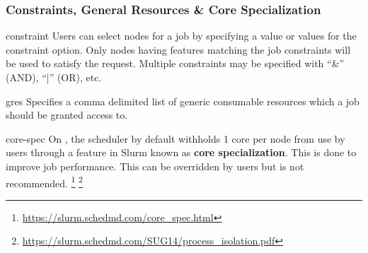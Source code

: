 \begin{frame}
\frametitle{Constraints, General Resources \& Core Specialization}
\vspace{-8pt}
\begin{block}{{\ddash}constraint} Users can select nodes for a job by specifying a value or values for the constraint option. Only nodes having features matching the job constraints will be used to satisfy the request. Multiple constraints may be specified with ``\&'' (AND), ``|'' (OR), etc.
\end{block}
\vspace{-5pt}
\begin{block}{{\ddash}gres} Specifies a comma delimited list of generic consumable resources which a job should be granted access to. 
\end{block}
\vspace{-5pt}
\begin{block}{{\ddash}core-spec}
On {\mana}, the scheduler by default withholds 1 core per node from use by users through a feature in Slurm known as \textbf{core specialization}.  This is done to improve job performance.  This can be overridden by users but is not recommended.
\footnote[1,frame]{\tiny \href{https://slurm.schedmd.com/core_spec.html}{https://slurm.schedmd.com/core\_spec.html}} \footnote[2,frame]{\tiny \href{https://slurm.schedmd.com/SUG14/process_isolation.pdf}{https://slurm.schedmd.com/SUG14/process\_isolation.pdf}}
\end{block}
\end{frame}
